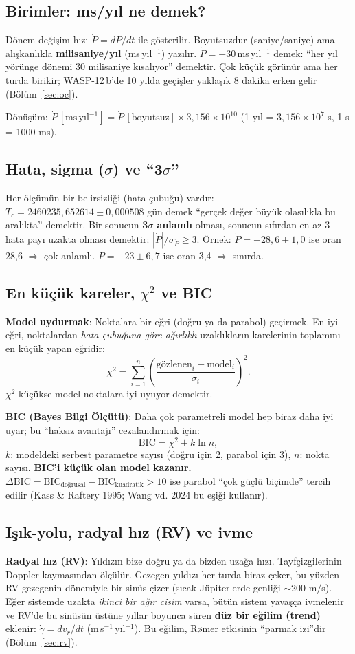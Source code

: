 \documentclass[11pt,a4paper]{article}
\newcommand{\msyil}{\,ms\,yıl$^{-1}$}
\begin{document}
\subsection{Birimler: ms/yıl ne demek?}
Dönem değişim hızı $\dot P = dP/dt$ ile gösterilir. Boyutsuzdur (saniye/saniye) ama alışkanlıkla
\textbf{milisaniye/yıl} (ms\,yıl$^{-1}$) yazılır. $\dot P = -30$\msyil{} demek: “her yıl yörünge dönemi
30 milisaniye kısalıyor” demektir. Çok küçük görünür ama her turda birikir; WASP-12\,b'de 10 yılda geçişler
yaklaşık 8 dakika erken gelir (Bölüm~\ref{sec:oc}).

Dönüşüm: $\dot P\,[\mathrm{ms\,yıl^{-1}}] = \dot P\,[\text{boyutsuz}] \times 3{,}156\times 10^{10}$
(1 yıl = $3{,}156\times10^{7}$ s, 1 s = 1000 ms).

\subsection{Hata, sigma ($\sigma$) ve “3$\sigma$”}
Her ölçümün bir belirsizliği (hata çubuğu) vardır: $T_c = 2460235{,}652614 \pm 0{,}000508$ gün demek
“gerçek değer büyük olasılıkla bu aralıkta” demektir. Bir sonucun \textbf{3$\sigma$ anlamlı} olması, sonucun
sıfırdan en az 3 hata payı uzakta olması demektir: $|\dot P| / \sigma_{\dot P} \ge 3$. Örnek:
$\dot P = -28{,}6 \pm 1{,}0$ ise oran 28,6 $\Rightarrow$ çok anlamlı. $\dot P = -23 \pm 6{,}7$ ise oran 3,4
$\Rightarrow$ sınırda.

\subsection{En küçük kareler, $\chi^2$ ve BIC}
\textbf{Model uydurmak}: Noktalara bir eğri (doğru ya da parabol) geçirmek. En iyi eğri, noktalardan
\emph{hata çubuğuna göre ağırlıklı} uzaklıkların karelerinin toplamını en küçük yapan eğridir:
\[
\chi^2 = \sum_{i=1}^{n} \left( \frac{\text{gözlenen}_i - \text{model}_i}{\sigma_i} \right)^2 .
\]
$\chi^2$ küçükse model noktalara iyi uyuyor demektir.

\textbf{BIC (Bayes Bilgi Ölçütü)}: Daha çok parametreli model hep biraz daha iyi uyar; bu “haksız avantajı”
cezalandırmak için:
\[
\mathrm{BIC} = \chi^2 + k \ln n ,
\]
$k$: modeldeki serbest parametre sayısı (doğru için 2, parabol için 3), $n$: nokta sayısı.
\textbf{BIC'i küçük olan model kazanır.} $\Delta\mathrm{BIC} = \mathrm{BIC}_\text{doğrusal} -
\mathrm{BIC}_\text{kuadratik} > 10$ ise parabol “çok güçlü biçimde” tercih edilir (Kass \& Raftery 1995;
Wang vd. 2024 bu eşiği kullanır).

\subsection{Işık-yolu, radyal hız (RV) ve ivme}
\textbf{Radyal hız (RV)}: Yıldızın bize doğru ya da bizden uzağa hızı. Tayfçizgilerinin Doppler kaymasından
ölçülür. Gezegen yıldızı her turda biraz çeker, bu yüzden RV gezegenin dönemiyle bir sinüs çizer
(sıcak Jüpiterlerde genliği $\sim$200 m/s). Eğer sistemde uzakta \emph{ikinci bir ağır cisim} varsa, bütün sistem
yavaşça ivmelenir ve RV'de bu sinüsün üstüne yıllar boyunca süren \textbf{düz bir eğilim (trend)} eklenir:
$\dot\gamma = dv_r/dt$ (m\,s$^{-1}$\,yıl$^{-1}$). Bu eğilim, Rømer etkisinin “parmak izi”dir (Bölüm~\ref{sec:rv}).
\end{document}
